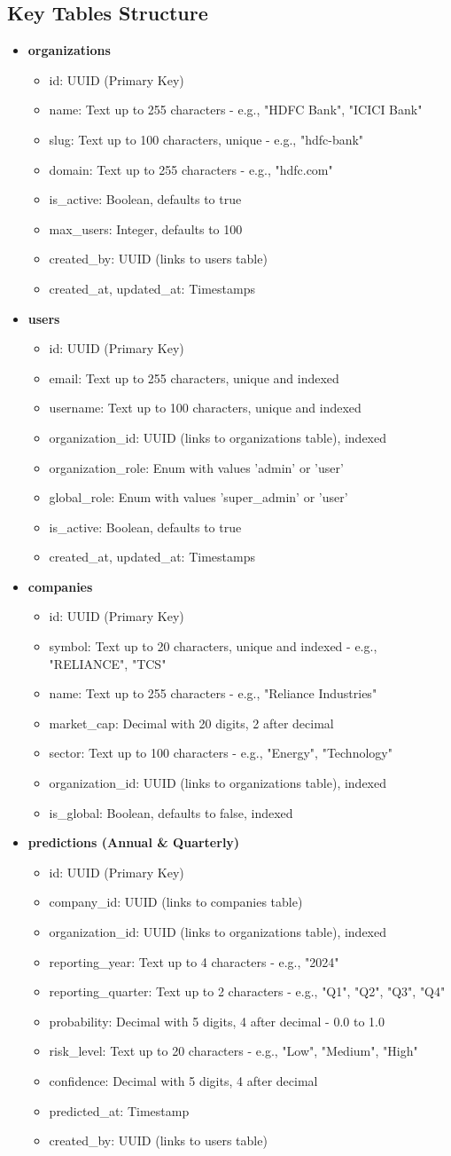 \documentclass[a4paper,12pt]{article}
\newcommand{\subitem}[1]{\item[\textbullet] #1}
\begin{document}
\subsection*{Key Tables Structure}
\begin{itemize}
    \subitem \textbf{organizations}
    \begin{itemize}
        \subitem id: UUID (Primary Key)
        \subitem name: Text up to 255 characters - e.g., "HDFC Bank", "ICICI Bank"
        \subitem slug: Text up to 100 characters, unique - e.g., "hdfc-bank"
        \subitem domain: Text up to 255 characters - e.g., "hdfc.com"
        \subitem is_active: Boolean, defaults to true
        \subitem max_users: Integer, defaults to 100
        \subitem created_by: UUID (links to users table)
        \subitem created_at, updated_at: Timestamps
    \end{itemize}
    \subitem \textbf{users}
    \begin{itemize}
        \subitem id: UUID (Primary Key)
        \subitem email: Text up to 255 characters, unique and indexed
        \subitem username: Text up to 100 characters, unique and indexed
        \subitem organization_id: UUID (links to organizations table), indexed
        \subitem organization_role: Enum with values 'admin' or 'user'
        \subitem global_role: Enum with values 'super_admin' or 'user'
        \subitem is_active: Boolean, defaults to true
        \subitem created_at, updated_at: Timestamps
    \end{itemize}
    \subitem \textbf{companies}
    \begin{itemize}
        \subitem id: UUID (Primary Key)
        \subitem symbol: Text up to 20 characters, unique and indexed - e.g., "RELIANCE", "TCS"
        \subitem name: Text up to 255 characters - e.g., "Reliance Industries"
        \subitem market_cap: Decimal with 20 digits, 2 after decimal
        \subitem sector: Text up to 100 characters - e.g., "Energy", "Technology"
        \subitem organization_id: UUID (links to organizations table), indexed
        \subitem is_global: Boolean, defaults to false, indexed
    \end{itemize}
    \subitem \textbf{predictions (Annual \& Quarterly)}
    \begin{itemize}
        \subitem id: UUID (Primary Key)
        \subitem company_id: UUID (links to companies table)
        \subitem organization_id: UUID (links to organizations table), indexed
        \subitem reporting_year: Text up to 4 characters - e.g., "2024"
        \subitem reporting_quarter: Text up to 2 characters - e.g., "Q1", "Q2", "Q3", "Q4"
        \subitem probability: Decimal with 5 digits, 4 after decimal - 0.0 to 1.0
        \subitem risk_level: Text up to 20 characters - e.g., "Low", "Medium", "High"
        \subitem confidence: Decimal with 5 digits, 4 after decimal
        \subitem predicted_at: Timestamp
        \subitem created_by: UUID (links to users table)
    \end{itemize}
\end{itemize}
\end{document}
